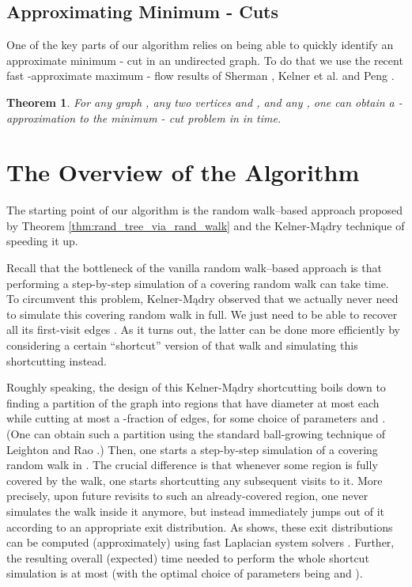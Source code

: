 \documentclass[11pt, letterpaper]{article}
\newtheorem{theorem}{Theorem}[section]
\begin{document}
\subsection{Approximating Minimum - Cuts} \label{sec:approximating_minimum_cuts}

One of the key parts of our algorithm relies on being able to quickly identify an approximate minimum - cut in an undirected graph. To do that we use the recent fast -approximate maximum - flow results of Sherman \cite{Sherman13}, Kelner et al. \cite{KelnerLOS14} and Peng \cite{Peng14}.



\begin{theorem}
For any graph , any two vertices  and , and any , one can obtain a -approximation to the minimum - cut problem in  in  time.
\end{theorem}

 \section{The Overview of the Algorithm} \label{sec:overview}

The starting point of our algorithm is the random walk--based approach proposed by Theorem \ref{thm:rand_tree_via_rand_walk} and the Kelner-Mądry technique \cite{KelnerM09} of speeding it up. 

Recall that the bottleneck of the vanilla random walk--based approach is that performing a step-by-step simulation of a covering random walk can take  time. To circumvent this problem,  Kelner-Mądry observed that we actually never need to simulate this covering random walk in full. We just need to be able to recover all its first-visit edges . As it turns out, the latter can be done more efficiently by considering a certain ``shortcut'' version of that walk and simulating this shortcutting instead.

Roughly speaking, the design of this Kelner-Mądry shortcutting boils down to finding a partition of the graph  into regions that have diameter at most  each while cutting at most a -fraction of edges, for some choice of parameters  and . (One can obtain such a partition using the standard ball-growing technique of Leighton and Rao \cite{LeightonR99}.) Then, one starts a step-by-step simulation of a covering random walk in . The crucial difference is that whenever some region is fully covered by the walk, one starts shortcutting any subsequent visits to it. More precisely, upon future revisits to such an already-covered region, one never simulates the walk inside it anymore, but instead immediately jumps out of it according to an appropriate exit distribution. As \cite{KelnerM09} shows, these exit distributions can be computed (approximately) using fast Laplacian system solvers \cite{SpielmanT03,SpielmanT04,KoutisMP10,KoutisMP11,KelnerOSZ13}. Further, the resulting overall (expected) time needed to perform the whole shortcut simulation is at most  (with the optimal choice of parameters being  and ).
\end{document}
